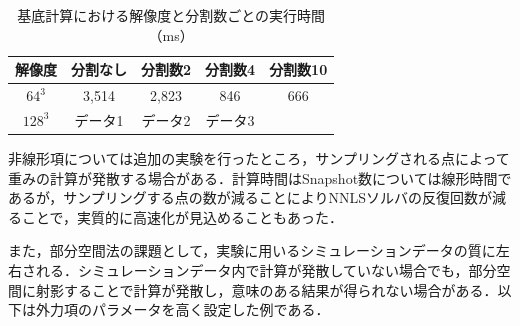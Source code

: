 \documentclass[a4j,12pt]{jreport}
\begin{document}
\begin {table}[t]
    \centering
  \caption{基底計算における解像度と分割数ごとの実行時間（ms）}
  \label{tab:results}
  \begin {tabular}{ccccc} \hline
    解像度 					&分割なし 		&分割数2			&分割数4 		&分割数10\\ \hline
    $64^3$ 					& 3,514 			&2,823	 		&846	 		&666\\
    $128^3$ 				& データ1 		& データ2 		& データ3 	&\\ \hline
  \end {tabular}
\end {table}

非線形項については追加の実験を行ったところ，サンプリングされる点によって重みの計算が発散する場合がある．計算時間はSnapshot数については線形時間であるが，サンプリングする点の数が減ることによりNNLSソルバの反復回数が減ることで，実質的に高速化が見込めることもあった．

また，部分空間法の課題として，実験に用いるシミュレーションデータの質に左右される．シミュレーションデータ内で計算が発散していない場合でも，部分空間に射影することで計算が発散し，意味のある結果が得られない場合がある．以下は外力項のパラメータを高く設定した例である．
\end{document}
